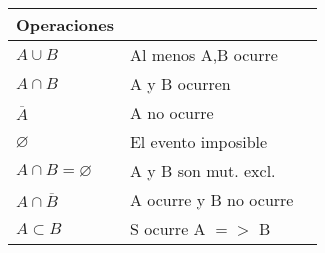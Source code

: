 \begin{minipage}{0.22\textwidth}
	\begin{tabular}{lp{3cm} l}
		{\bf Operaciones}        & {\bf }                 \\  \hline
		$A \cup B$               & Al menos A,B ocurre    \\
		$A \cap B$               & A y B ocurren          \\
		$\overline{A}$           & A no ocurre            \\
		$\varnothing$            & El evento imposible    \\
		$A \cap B = \varnothing$ & A y B son mut. excl.   \\
		$A \cap \overline{B}$    & A ocurre y B no ocurre \\
		$A \subset B$            & S ocurre A $=>$ B      \\ \hline
	\end{tabular}
\end{minipage}

